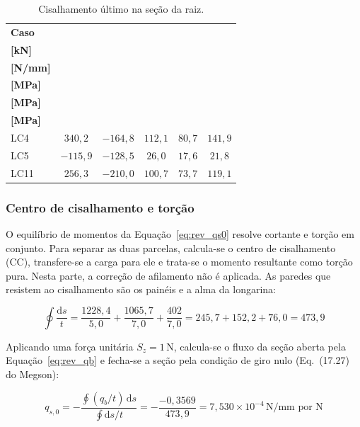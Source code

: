 \begin{table}[H]
\centering
\caption{Cisalhamento último na seção da raiz.}
\label{tab:rev_cisalhamento_raiz}
\begin{tabular}{lccccc}
\toprule
\textbf{Caso} & \makecell{\boldmath$S_{z,w}$\\\textbf{[kN]}} & \makecell{\boldmath$q_{s,0}$\\\textbf{[N/mm]}} & \makecell{\boldmath$\tau_{extr}$\\\textbf{[MPa]}} & \makecell{\boldmath$\tau_{intr}$\\\textbf{[MPa]}} & \makecell{\boldmath$\tau_{w}$\\\textbf{[MPa]}} \\
\midrule
LC4 & $340{,}2$ & $-164{,}8$ & $112{,}1$ & $80{,}7$ & $141{,}9$ \\
LC5 & $-115{,}9$ & $-128{,}5$ & $26{,}0$ & $17{,}6$ & $21{,}8$ \\
LC11 & $256{,}3$ & $-210{,}0$ & $100{,}7$ & $73{,}7$ & $119{,}1$ \\
\bottomrule
\end{tabular}
\end{table}
 
\subsubsection{Centro de cisalhamento e torção}
 
O equilíbrio de momentos da Equação~\ref{eq:rev_qs0} resolve cortante e torção em conjunto. Para separar as duas parcelas, calcula-se o centro de cisalhamento (CC), transfere-se a carga para ele e trata-se o momento resultante como torção pura. Nesta parte, a correção de afilamento não é aplicada. As paredes que resistem ao cisalhamento são os painéis e a alma da longarina:
 
\begin{equation}
    \oint \frac{\mathrm{d}s}{t} = \frac{1228{,}4}{5{,}0} + \frac{1065{,}7}{7{,}0} + \frac{402}{7{,}0} = 245{,}7 + 152{,}2 + 76{,}0 = 473{,}9
    \label{eq:rev_dst}
\end{equation}
 
Aplicando uma força unitária $S_z = 1$\,N, calcula-se o fluxo da seção aberta pela Equação~\ref{eq:rev_qb} e fecha-se a seção pela condição de giro nulo (Eq.~(17.27) do Megson):
 
\begin{equation}
    q_{s,0} = -\frac{\oint (q_b/t)\,\mathrm{d}s}{\oint \mathrm{d}s/t} = -\frac{-0{,}3569}{473{,}9} = 7{,}530 \times 10^{-4}\,\text{N/mm por N}
    \label{eq:rev_qs0_cc}
\end{equation}
 
